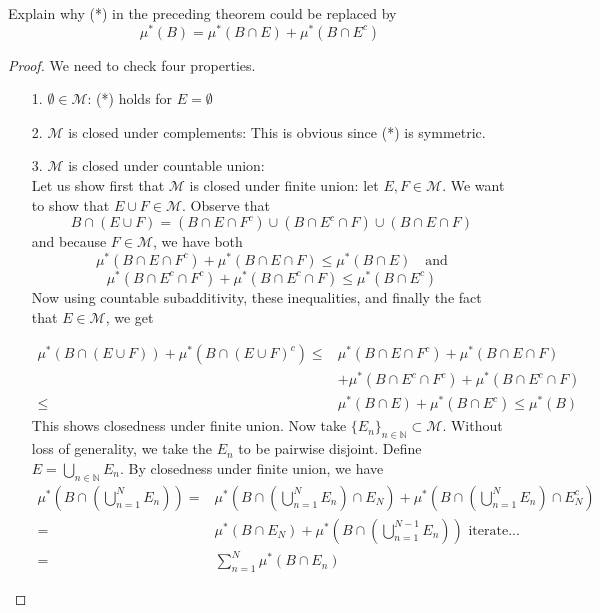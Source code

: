 \documentclass[11pt]{scrartcl}
\begin{document}
\begin{exercise}
Explain why (*) in the preceding theorem could be replaced by\\
$$\mu^*(B) = \mu^*(B\cap E) + \mu^*(B \cap E^c)$$
\end{exercise}

\begin{proof}
We need to check four properties. \\
\begin{itemize}
\item[1.] $\emptyset \in \mathcal{M}$: (*) holds for $E = \emptyset$ \\
\item[2.] $\mathcal{M}$ is closed under complements: This is obvious since (*) is symmetric.\\
\item[3.] $\mathcal{M}$ is closed under countable union: \\ 
Let us show first that $\mathcal{M}$ is closed under finite union: let $E,F \in \mathcal{M}$. We want to show that $E \cup F \in \mathcal{M}$. Observe that 
$$ B\cap (E \cup F) = (B\cap E \cap F^c) \cup (B\cap E^c \cap F) \cup (B\cap E \cap F)$$ and because $F\in \mathcal{M}$, we have both
$$\mu^*(B\cap E \cap F^c) + \mu^*(B\cap E \cap F) \leq \mu^*(B\cap E) \quad \text{and}$$
$$\mu^*(B\cap E^c \cap F^c) + \mu^*(B\cap E^c \cap F) \leq \mu^*(B\cap E^c)$$
Now using countable subadditivity, these inequalities, and finally the fact that $E \in \mathcal{M}$, we get

\begin{align*}
\mu^*(B\cap (E \cup F)) + \mu^*(B\cap (E \cup F)^c) {} \leq & \mu^*(B\cap E \cap F^c) + \mu^*(B\cap E \cap F)\\
& + \mu^*(B\cap E^c \cap F^c) + \mu^*(B\cap E^c \cap F) \\
\leq & \mu^*(B\cap E) + \mu^*(B\cap E^c) \leq \mu^*(B) 
\end{align*}
This shows closedness under finite union.
Now take $\{E_n\}_{n\in \mathbb{N}}\subset \mathcal{M}$. Without loss of generality, we take the $E_n$ to be pairwise disjoint. Define $ E  = \bigcup_{n\in \mathbb{N}} E_n$. By closedness under finite union, we have 
\begin{align*}
\mu^*(B\cap (\bigcup_{n=1}^N E_n)) = & \mu^*(B\cap (\bigcup_{n=1}^N E_n) \cap E_N) + \mu^*(B\cap (\bigcup_{n=1}^N E_n) \cap E_N^c) \\
 = & \mu^*(B \cap E_N) + \mu^*(B\cap (\bigcup_{n=1}^{N-1} E_n)) \text{  iterate...}\\
 =  & \sum_{n=1}^N \mu^*(B \cap E_n)
\end{align*}


\end{itemize}
\end{proof}
\end{document}
